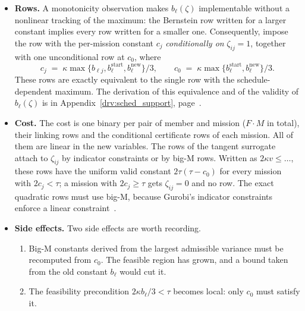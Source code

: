 \documentclass[11pt,a4paper]{article}
\theoremstyle{plain}
\theoremstyle{definition}
\theoremstyle{remark}
\begin{document}
\begin{itemize}
\begin{equation}
    \end{equation}
    Here $\zeta_{ij} \in \{0,1\}$ marks the missions that member~$i$ actually serves ($\zeta_{ij} \ge x_{ijt}$ for all~$t$; only this direction of the forcing is needed).
    The constant $b_\ell(\zeta)$ bounds every summand of the state, and Bernstein's inequality applies without change, on every day and in every repetition of the schedule.
  \item \textbf{Rows.} A monotonicity observation makes $b_\ell(\zeta)$ implementable without a nonlinear tracking of the maximum: the Bernstein row written for a larger constant implies every row written for a smaller one.
    Consequently, impose the row with the per-mission constant $c_j$ \emph{conditionally on} $\zeta_{ij} = 1$, together with one unconditional row at $c_0$, where
    \begin{equation}
      c_j \;=\; \kappa\max\{b_{\ell j}, b^{\mathrm{start}}_\ell, b^{\mathrm{new}}_\ell\}/3,
      \qquad
      c_0 \;=\; \kappa\max\{b^{\mathrm{start}}_\ell, b^{\mathrm{new}}_\ell\}/3.
    \end{equation}
    These rows are exactly equivalent to the single row with the schedule-dependent maximum.
    The derivation of this equivalence and of the validity of $b_\ell(\zeta)$ is in Appendix~\ref{drv:sched_support}, page~\pageref{drv:sched_support}.
  \item \textbf{Cost.} The cost is one binary per pair of member and mission ($F \cdot M$ in total), their linking rows and the conditional certificate rows of each mission.
    All of them are linear in the new variables.
    The rows of the tangent surrogate attach to $\zeta_{ij}$ by indicator constraints or by big-M rows. Written as $2\kappa v \le \dots$, these rows have the uniform valid constant $2\tau(\tau - c_0)$ for every mission with $2c_j < \tau$; a mission with $2c_j \ge \tau$ gets $\zeta_{ij} = 0$ and no row.
    The exact quadratic rows must use big-M, because Gurobi's indicator constraints enforce a linear constraint~\cite{GurobiConstraints}.
  \item \textbf{Side effects.} Two side effects are worth recording.
    \begin{enumerate}
      \item Big-M constants derived from the largest admissible variance must be recomputed from $c_0$.
        The feasible region has grown, and a bound taken from the old constant $b_\ell$ would cut it.
      \item The feasibility precondition $2\kappa b_\ell/3 < \tau$ becomes local: only $c_0$ must satisfy it.

\end{enumerate}
\end{itemize}
\end{document}
